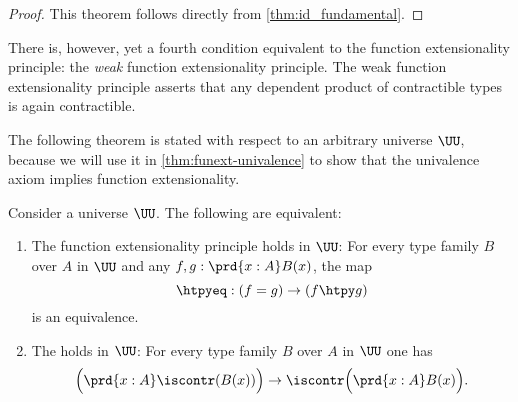 \begin{proof}
  This theorem follows directly from \cref{thm:id_fundamental}.
\end{proof}

There is, however, yet a fourth condition equivalent to the function extensionality principle: the \emph{weak} function extensionality principle. The weak function extensionality principle asserts that any dependent product of contractible types is again contractible.

The following theorem is stated with respect to an arbitrary universe $\UU$, because we will use it in \cref{thm:funext-univalence} to show that the univalence axiom implies function extensionality.

\begin{thm}\label{thm:funext_wkfunext}
  Consider a universe $\UU$. The following are equivalent:
  \begin{enumerate}
  \item The function extensionality principle holds in $\UU$: For every type family $B$ over $A$ in $\UU$ and any $f,g:\prd{x:A}B(x)$, the map
    \begin{equation*}
      \htpyeq : (f=g)\to (f\htpy g)
    \end{equation*}
    is an equivalence.
  \item The  holds in $\UU$: For every type family $B$ over $A$ in $\UU$ one has
    \begin{equation*}
      \Big(\prd{x:A}\iscontr(B(x))\Big)\to\iscontr\Big(\prd{x:A}B(x)\Big).
    \end{equation*}
  \end{enumerate}
\end{thm}

